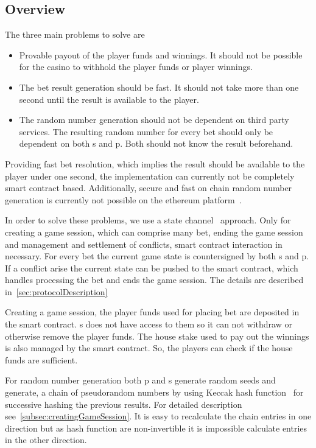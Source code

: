 \documentclass[oneside]{amsart}
\begin{document}
\begin{multicols}{2}
\section{Overview}\label{sec:overview}
The three main problems to solve are
\begin{itemize}
    \item Provable payout of the player funds and winnings. It should not be possible for the casino to withhold the player
        funds or player winnings.
    \item The bet result generation should be fast.
        It should not take more than one second until the result is available to the player.
    \item The random number generation should not be dependent on third party services.
        The resulting random number for every bet should only be dependent on both \gls{s} and \gls{p}.
        Both should not know the result beforehand.
\end{itemize}

Providing fast bet resolution, which implies the result should be available to the player under one second, the implementation
can currently not be completely smart contract based.
Additionally, secure and fast on chain random number generation is currently not possible on the ethereum platform~\cite{hpoc2015}.

In order to solve these problems, we use a state channel~\cite{stateChannel} approach.
Only for creating a game session, which can comprise many bet, ending the game session and management and settlement of
conflicts, smart contract interaction in necessary.
For every bet the current game state is countersigned by both \gls{s} and \gls{p}.
If a conflict arise the current state can be pushed to the smart contract, which handles processing the bet and
ends the game session.
The details are described in~\autoref{sec:protocolDescription}

Creating a game session, the player funds used for placing bet are deposited in the smart contract.
\Gls{s} does not have access to them so it can not withdraw or otherwise remove the player funds.
The house stake used to pay out the winnings is also managed by the smart contract.
So, the players can check if the house funds are sufficient.

For random number generation both \gls{p} and \gls{s} generate random seeds and generate,
a chain of pseudorandom numbers by using Keccak hash function~\cite{keccak} for successive hashing the previous results.
For detailed description see~\autoref{subsec:creatingGameSession}.
It is easy to recalculate the chain entries in one direction but as hash function are non-invertible it is impossible
calculate entries in the other direction.


\end{multicols}
\end{document}
